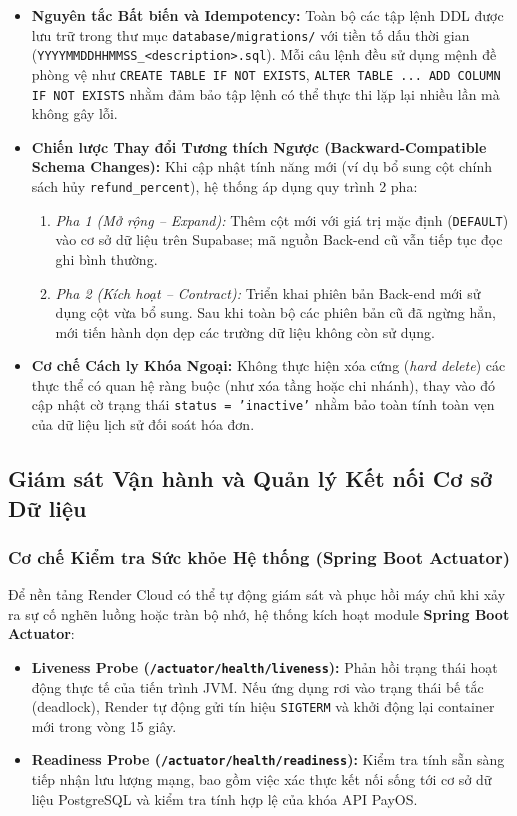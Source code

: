 \begin{itemize}
    \item \textbf{Nguyên tắc Bất biến và Idempotency:} Toàn bộ các tập lệnh DDL được lưu trữ trong thư mục \texttt{database/migrations/} với tiền tố dấu thời gian (\texttt{YYYYMMDDHHMMSS\_<description>.sql}). Mỗi câu lệnh đều sử dụng mệnh đề phòng vệ như \texttt{CREATE TABLE IF NOT EXISTS}, \texttt{ALTER TABLE ... ADD COLUMN IF NOT EXISTS} nhằm đảm bảo tập lệnh có thể thực thi lặp lại nhiều lần mà không gây lỗi.
    \item \textbf{Chiến lược Thay đổi Tương thích Ngược (Backward-Compatible Schema Changes):} Khi cập nhật tính năng mới (ví dụ bổ sung cột chính sách hủy \texttt{refund\_percent}), hệ thống áp dụng quy trình 2 pha:
    \begin{enumerate}
        \item \textit{Pha 1 (Mở rộng -- Expand):} Thêm cột mới với giá trị mặc định (\texttt{DEFAULT}) vào cơ sở dữ liệu trên Supabase; mã nguồn Back-end cũ vẫn tiếp tục đọc ghi bình thường.
        \item \textit{Pha 2 (Kích hoạt -- Contract):} Triển khai phiên bản Back-end mới sử dụng cột vừa bổ sung. Sau khi toàn bộ các phiên bản cũ đã ngừng hẳn, mới tiến hành dọn dẹp các trường dữ liệu không còn sử dụng.
    \end{enumerate}
    \item \textbf{Cơ chế Cách ly Khóa Ngoại:} Không thực hiện xóa cứng (\textit{hard delete}) các thực thể có quan hệ ràng buộc (như xóa tầng hoặc chi nhánh), thay vào đó cập nhật cờ trạng thái \texttt{status = 'inactive'} nhằm bảo toàn tính toàn vẹn của dữ liệu lịch sử đối soát hóa đơn.
\end{itemize}

\subsection{Giám sát Vận hành và Quản lý Kết nối Cơ sở Dữ liệu}

\subsubsection{Cơ chế Kiểm tra Sức khỏe Hệ thống (Spring Boot Actuator)}

Để nền tảng Render Cloud có thể tự động giám sát và phục hồi máy chủ khi xảy ra sự cố nghẽn luồng hoặc tràn bộ nhớ, hệ thống kích hoạt module \textbf{Spring Boot Actuator}:
\begin{itemize}
    \item \textbf{Liveness Probe (\texttt{/actuator/health/liveness}):} Phản hồi trạng thái hoạt động thực tế của tiến trình JVM. Nếu ứng dụng rơi vào trạng thái bế tắc (deadlock), Render tự động gửi tín hiệu \texttt{SIGTERM} và khởi động lại container mới trong vòng 15 giây.
    \item \textbf{Readiness Probe (\texttt{/actuator/health/readiness}):} Kiểm tra tính sẵn sàng tiếp nhận lưu lượng mạng, bao gồm việc xác thực kết nối sống tới cơ sở dữ liệu PostgreSQL và kiểm tra tính hợp lệ của khóa API PayOS.
\end{itemize}

